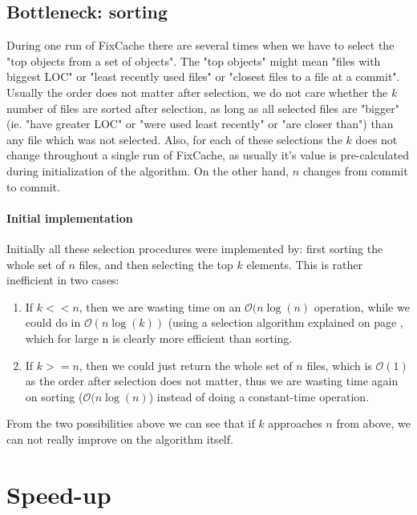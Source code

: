 \documentclass[12pt,twoside,notitlepage]{report}
\newcommand{\fxch}{FixCache}
\begin{document}
\subsection{Bottleneck: sorting}
During one run of \fxch{} there are several times when we have to select the "top objects from a set of objects". The "top objects" might mean "files with biggest LOC" or "least recently used files" or "closest files to a file at a commit". Usually the order does not matter after selection, we do not care whether the $k$ number of files are sorted after selection, as long as all selected files are "bigger" (ie. "have greater LOC" or "were used least recently" or "are closer than") than any file which was not selected. Also, for each of these selections the $k$ does not change throughout a single run of \fxch{}, as usually it's value is pre-calculated during initialization of the algorithm. On the other hand, $n$ changes from commit to commit.
\paragraph{Initial implementation}
Initially all these selection procedures were implemented by: first sorting the whole set of $n$ files, and then selecting the top $k$ elements. This is rather inefficient in two cases:
\begin{enumerate}
\item If $k << n$, then we are wasting time on an $\mathcal{O}(n\log(n)$ operation, while we could do in $\mathcal{O}(n\log(k))$ (using a selection algorithm explained on page \pageref{gettopk}, which for large n is clearly more efficient than sorting.
\item If $k >= n$, then we could just return the whole set of $n$ files, which is $\mathcal{O}(1)$ as the order after selection does not matter, thus we are wasting time again on sorting ($\mathcal{O}(n\log(n)$) instead of doing a constant-time operation.
\end{enumerate}
From the two possibilities above we can see that if $k$ approaches $n$ from above, we can not really improve on the algorithm itself.
\section{Speed-up}\label{gettopk}
\end{document}
